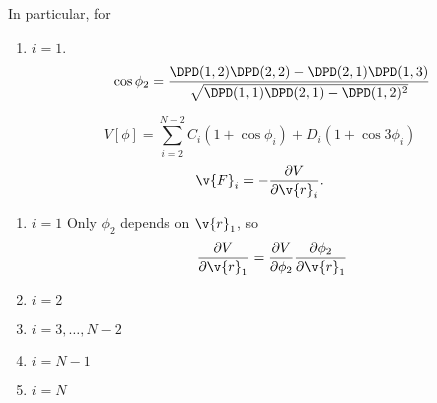 In particular, for 
\begin{enumerate}
  \item $i=1$. 
    \begin{equation}
      \cos\phi_2=\frac
      {\DPD(1,2)\DPD(2,2)-\DPD(2,1)\DPD(1,3)}
      {\sqrt{\DPD(1,1)\DPD(2,1)-\DPD(1,2)^2}}
    \end{equation}
\end{enumerate}


\begin{equation}
  V[\phi]=\sum_{i=2}^{N-2}C_i(1+\cos{\phi_i})+D_i(1+\cos{3\phi_i})
\end{equation}
\begin{equation}
  \v{F}_i=-\frac{\partial V}{\partial \v{r}_i}.
\end{equation}
\begin{enumerate}
  \item $i=1$ Only $\phi_2$ depends on $\v{r}_1$, so
    \begin{equation}
      \frac{\partial V}{\partial \v{r}_1}=
      {\frac{\partial V}{\partial\phi_2}}
      {\frac{\partial\phi_2}{\partial\v{r}_1}}
    \end{equation}
  \item $i=2$
  \item $i=3,\ldots,N-2$
  \item $i=N-1$
  \item $i=N$
\end{enumerate}


